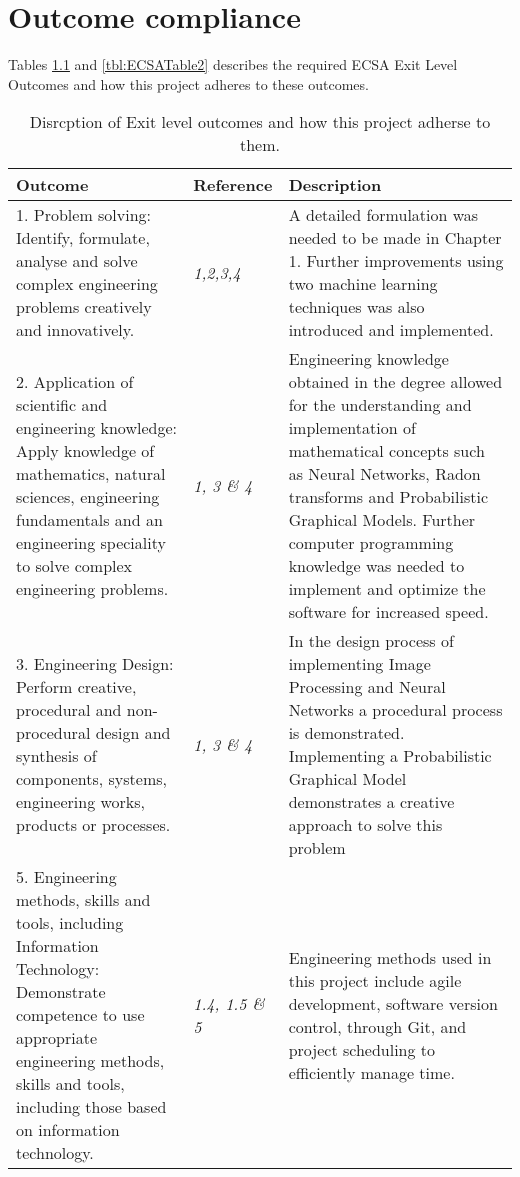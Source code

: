 \chapter{Outcome compliance}
\label{ap:outCompliance}
\graphicspath{{Appendix2/Appendix2figures/}}
Tables \ref{tbl:ECSATable1} and \ref{tbl:ECSATable2} describes the required ECSA Exit Level Outcomes and how this project adheres to these outcomes.
\begin{table}
\begin{tabular}{|p{6cm}|p{3cm}|p{6cm}|}
\hline
\textbf{Outcome}&\textbf{Reference}&\textbf{Description}\\
\hline
1. Problem solving: Identify, formulate, analyse and solve complex engineering problems creatively and innovatively. & \textit{1,2,3,4} & A detailed formulation was needed to be made in Chapter 1. Further improvements using two machine learning techniques was also introduced and implemented.\\
\hline
2. Application of scientific and engineering knowledge: Apply knowledge of mathematics, natural sciences,
engineering fundamentals and an engineering speciality to solve complex engineering problems. & \textit{1, 3 \& 4} & Engineering knowledge obtained in the degree allowed for the understanding and implementation of mathematical concepts such as Neural Networks, Radon transforms and Probabilistic Graphical Models. Further computer programming knowledge was needed to implement and optimize the software for increased speed.\\
\hline
3. Engineering Design: Perform creative, procedural and non-procedural design and synthesis of components, systems,
engineering works, products or processes. & \textit{1, 3 \& 4} & In the design process of implementing Image Processing and Neural Networks a procedural process is demonstrated. Implementing a Probabilistic Graphical Model demonstrates a creative approach to solve this problem\\
\hline
5. Engineering methods, skills and tools, including Information Technology: Demonstrate competence to use
appropriate engineering methods, skills and tools, including those based on information technology. &\textit{1.4, 1.5 \& 5}  & Engineering methods used in this project include agile development, software version control, through Git, and project scheduling to efficiently manage time.        \\
\hline
\end{tabular}
\caption{Disrcption of Exit level outcomes and how this project adherse to them.} \label{tbl:ECSATable1}
\end{table}
